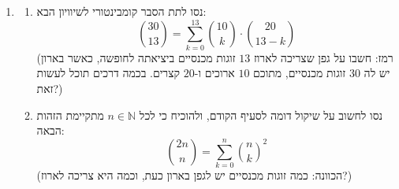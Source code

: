 \documentclass[12pt, a4paper]{article}
\newcommand{\nn}{\mathbb{N}}
\begin{document}
\begin{enumerate}
\item
\begin{enumerate}
\item
נסו לתת הסבר קומבינטורי לשיוויון הבא:
$$\binom{30}{13}
=\sum_{k=0}^{13}
\binom{10}{k}\cdot \binom{20}{13-k}$$
(רמז:
חשבו על
גפן שצריכה לארוז 
$13$
זוגות מכנסיים 
ביציאתה לחופשה, כאשר בארון יש לה
$30$
זוגות מכנסיים, מתוכם 
$10$
ארוכים
ו-$20$
קצרים. בכמה דרכים תוכל לעשות זאת?)
\item
נסו לחשוב על שיקול דומה לסעיף הקודם, ולהוכיח כי לכל
$n\in\nn$
מתקיימת הזהות הבאה:
$$\binom{2n}{n}=
\sum_{k=0}^{n}
\binom{n}{k}^2$$
(הכוונה: כמה זוגות מכנסיים יש לגפן בארון כעת, וכמה היא צריכה לארוז?)
\end{enumerate}
\end{enumerate}
\end{document}
